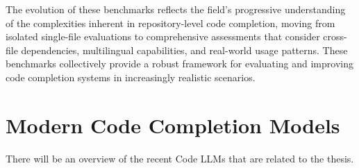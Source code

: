 The evolution of these benchmarks reflects the field's progressive understanding of the complexities inherent in repository-level code completion, moving from isolated single-file evaluations to comprehensive assessments that consider cross-file dependencies, multilingual capabilities, and real-world usage patterns. These benchmarks collectively provide a robust framework for evaluating and improving code completion systems in increasingly realistic scenarios.

\section{Modern Code Completion Models}

There will be an overview of the recent Code LLMs that are related to the thesis.
